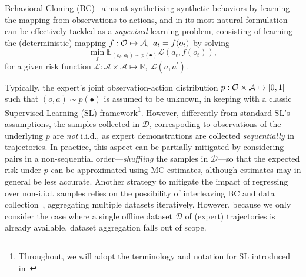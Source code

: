 Behavioral Cloning (BC)~\citep{pomerleauALVINNAutonomousLand1988a} aims at synthetizing synthetic behaviors by learning the mapping from observations to actions, and in its most natural formulation can be effectively tackled as a \emph{supevised} learning problem, consisting of learning the (deterministic) mapping \(f: \mathcal O \mapsto \mathcal A, \ a_t = f(o_t) \) by solving
\begin{equation}\label{eq:loss-minimization-SL}
    \min_{f} \mathbb{E}_{(o_t, a_t) \sim p(\bullet)} \mathcal L(a_t, f(o_t)),
\end{equation}
for a given risk function \( \mathcal L:  \mathcal A \times \mathcal A \mapsto \mathbb{R}, \ \mathcal L (a, a^\prime) \).

Typically, the expert's joint observation-action distribution \( p: \mathcal O \times \mathcal A \mapsto [0,1] \) such that \( (o,a) \sim p(\bullet) \) is assumed to be unknown, in keeping with a classic Supervised Learning (SL) framework\footnote{Throughout, we will adopt the terminology and notation for SL introduced in~\citet{shalev-shwartzUnderstandingMachineLearning2014}}.
However, differently from standard SL's assumptions, the samples collected in \( \mathcal D \), correspoding to observations of the underlying \( p \) are \emph{not} i.i.d., as expert demonstrations are collected \emph{sequentially} in trajectories.
In practice, this aspect can be partially mitigated by considering pairs in a non-sequential order---\emph{shuffling} the samples in \(\mathcal D \)---so that the expected risk under \( p \) can be approximated using MC estimates, although estimates may in general be less accurate.
Another strategy to mitigate the impact of regressing over non-i.i.d. samples relies on the possibility of interleaving BC and data collection~\citep{rossReductionImitationLearning2011}, aggregating multiple datasets iteratively.
However, because we only consider the case where a single offline dataset \( \mathcal D \) of (expert) trajectories is already available, dataset aggregation falls out of scope.

